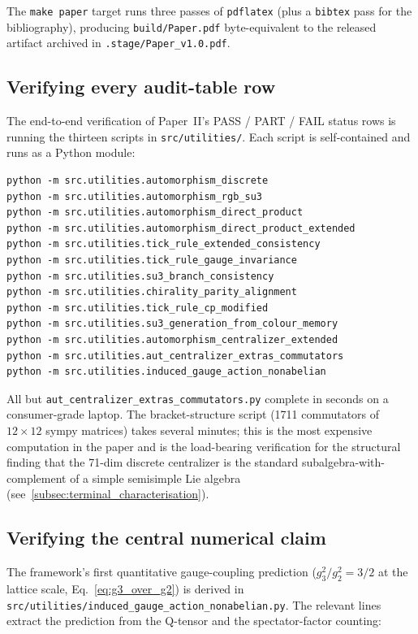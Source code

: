 The \texttt{make paper} target runs three passes of
\texttt{pdflatex} (plus a \texttt{bibtex} pass for the
bibliography), producing
\nolinkurl{build/Paper.pdf} byte-equivalent to the released
artifact archived in
\nolinkurl{.stage/Paper_v1.0.pdf}.

\subsection{Verifying every audit-table row}
\label{subsec:repro_audit}

The end-to-end verification of Paper~II's PASS / PART / FAIL
status rows is running the thirteen scripts in
\nolinkurl{src/utilities/}.  Each script is self-contained and
runs as a Python module:

{\scriptsize
\begin{verbatim}
python -m src.utilities.automorphism_discrete
python -m src.utilities.automorphism_rgb_su3
python -m src.utilities.automorphism_direct_product
python -m src.utilities.automorphism_direct_product_extended
python -m src.utilities.tick_rule_extended_consistency
python -m src.utilities.tick_rule_gauge_invariance
python -m src.utilities.su3_branch_consistency
python -m src.utilities.chirality_parity_alignment
python -m src.utilities.tick_rule_cp_modified
python -m src.utilities.su3_generation_from_colour_memory
python -m src.utilities.automorphism_centralizer_extended
python -m src.utilities.aut_centralizer_extras_commutators
python -m src.utilities.induced_gauge_action_nonabelian
\end{verbatim}
}

All but \nolinkurl{aut_centralizer_extras_commutators.py} complete
in seconds on a consumer-grade laptop.  The bracket-structure
script (1711 commutators of $12\times 12$ sympy matrices) takes
several minutes; this is the most expensive computation in the
paper and is the load-bearing verification for the structural
finding that the 71-dim discrete centralizer is the standard
subalgebra-with-complement of a simple semisimple Lie algebra
(see~\autoref{subsec:terminal_characterisation}).

\subsection{Verifying the central numerical claim}
\label{subsec:repro_central}

The framework's first quantitative gauge-coupling prediction
($g_3^2 / g_2^2 = 3/2$ at the lattice scale, Eq.~\eqref{eq:g3_over_g2})
is derived in \nolinkurl{src/utilities/induced_gauge_action_nonabelian.py}.
The relevant lines extract the prediction from the Q-tensor and
the spectator-factor counting:

